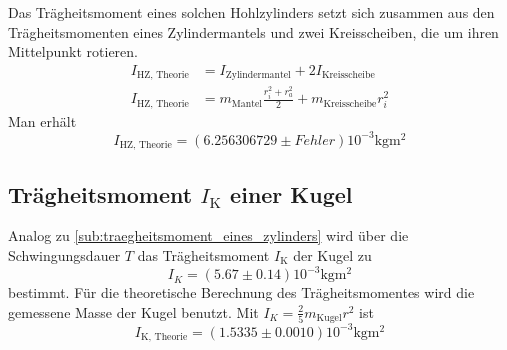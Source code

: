 Das Trägheitsmoment eines solchen Hohlzylinders setzt sich zusammen aus den Trägheitsmomenten eines Zylindermantels und zwei Kreisscheiben, die um ihren Mittelpunkt rotieren.
\begin{align*}
	I_{\text{HZ, Theorie}}&=I_{\text{Zylindermantel}}+2I_{\text{Kreisscheibe}}\\
	I_{\text{HZ, Theorie}}&=m_\text{Mantel} \frac{r_i^2+r_a^2}{2}+m_\text{Kreisscheibe} r_i^2
\end{align*}
Man erhält
\begin{equation}
	I_{\text{HZ, Theorie}}= (6.256306729\pm Fehler)10^{-3} \si{\kilo\gram\meter\squared}
\end{equation}
\subsection{Trägheitsmoment $I_\text{K}$ einer Kugel}

\noindent Analog zu \ref{sub:traegheitsmoment_eines_zylinders} wird über die Schwingungsdauer $T$ das Trägheitsmoment $I_\text{K}$ der Kugel zu
\begin{equation}
	\label{wert:Kugel}
	I_K=(5.67\pm0.14)10^{-3} \si{\kilo\gram\meter\squared}
\end{equation}
bestimmt.
Für die theoretische Berechnung des Trägheitsmomentes wird die gemessene Masse der Kugel benutzt.
Mit $I_K = \frac{2}{5} m_{\text{Kugel}} r^2$ ist 
\begin{equation}
	\label{wert:Kugel}
	I_\text{K, Theorie}= (1.5335\pm0.0010)10^{-3} \si{\kilo\gram\meter\squared}
\end{equation}
\newpage
